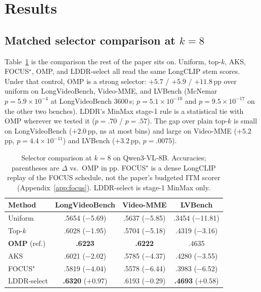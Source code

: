 \documentclass[11pt]{article}
\begin{document}
\section{Results}
\label{sec:results}

\subsection{Matched selector comparison at $k{=}8$}
\label{sec:t1}

Table~\ref{tab:t1} is the comparison the rest of the paper sits on.
Uniform, top-$k$, AKS, FOCUS$^\star$, OMP, and LDDR-select all read the same LongCLIP stem scores.
Under that control, OMP is a strong selector: ${+}5.7$ / ${+}5.9$ / ${+}11.8$\,pp over uniform on LongVideoBench, Video-MME, and LVBench (McNemar $p{=}5.9{\times}10^{-4}$ at LongVideoBench 3600\,s; $p{=}5.1{\times}10^{-10}$ and $p{=}9.5{\times}10^{-17}$ on the other two benches).
LDDR's MinMax stage-1 rule is a statistical tie with OMP wherever we tested it ($p{=}.70$ / $p{=}.57$).
The gap over plain top-$k$ is small on LongVideoBench (${+}2.0$\,pp, ns at most bins) and large on Video-MME (${+}5.2$\,pp, $p{=}4.4{\times}10^{-11}$) and LVBench (${+}3.2$\,pp, $p{=}.0075$).

\begin{table}[t]
\centering
\small
\begin{tabular}{lccc}
\toprule
Method & LongVideoBench & Video-MME & LVBench \\
\midrule
Uniform & .5654 ($-$5.69) & .5637 ($-$5.85) & .3454 ($-$11.81) \\
Top-$k$ & .6028 ($-$1.95) & .5704 ($-$5.18) & .4319 ($-$3.16) \\
\textbf{OMP} (ref.) & \textbf{.6223} & \textbf{.6222} & .4635 \\
AKS & .6021 ($-$2.02) & .5785 ($-$4.37) & .4280 ($-$3.55) \\
FOCUS$^\star$ & .5819 ($-$4.04) & .5578 ($-$6.44) & .3983 ($-$6.52) \\
LDDR-select & \textbf{.6320} (${+}0.97$) & .6193 ($-$0.29) & \textbf{.4693} (${+}0.58$) \\
\bottomrule
\end{tabular}
\caption{Selector comparison at $k{=}8$ on Qwen3-VL-8B. Accuracies; parentheses are $\Delta$ vs.\ OMP in pp.
FOCUS$^\star$ is a dense LongCLIP replay of the FOCUS schedule, not the paper's budgeted ITM scorer (Appendix~\ref{app:focus}).
LDDR-select is stage-1 MinMax only.}
\label{tab:t1}
\end{table}
\end{document}

